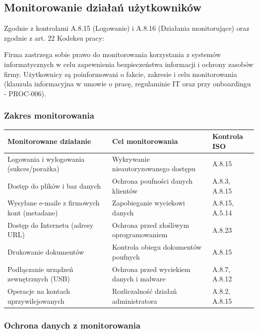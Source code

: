 \documentclass[12pt,a4paper]{article}
\begin{document}
\subsection{Monitorowanie działań użytkowników}\label{monitorowanie}

Zgodnie z kontrolami A.8.15 (Logowanie) i A.8.16 (Działania monitorujące) oraz zgodnie z art. 22 Kodeksu pracy:

Firma zastrzega sobie prawo do monitorowania korzystania z systemów informatycznych w celu zapewnienia bezpieczeństwa informacji i ochrony zasobów firmy. Użytkownicy są poinformowani o fakcie, zakresie i celu monitorowania (klauzula informacyjna w umowie o pracę, regulaminie IT oraz przy onboardingu - PROC-006).

\subsubsection{Zakres monitorowania}\label{zakres-monitorowania}

\begin{longtable}[]{@{}>{\raggedright\arraybackslash}p{}>{\raggedright\arraybackslash}p{}>{\raggedright\arraybackslash}p{}@{}}
\toprule\noalign{}
Monitorowane działanie & Cel monitorowania & Kontrola ISO \\
\midrule\noalign{}
\endhead
\bottomrule\noalign{}
\endlastfoot
Logowania i wylogowania (sukces/porażka) & Wykrywanie nieautoryzowanego dostępu & A.8.15 \\
Dostęp do plików i baz danych & Ochrona poufności danych klientów & A.8.3, A.8.15 \\
Wysyłane e-maile z firmowych kont (metadane) & Zapobieganie wyciekowi danych & A.8.15, A.5.14 \\
Dostęp do Internetu (adresy URL) & Ochrona przed złośliwym oprogramowaniem & A.8.23 \\
Drukowanie dokumentów & Kontrola obiegu dokumentów poufnych & A.8.15 \\
Podłączanie urządzeń zewnętrznych (USB) & Ochrona przed wyciekiem danych i malware & A.8.7, A.8.12 \\
Operacje na kontach uprzywilejowanych & Rozliczalność działań administratora & A.8.2, A.8.15 \\
\end{longtable}

\subsubsection{Ochrona danych z monitorowania}\label{ochrona-danych-monitoring}
\end{document}
